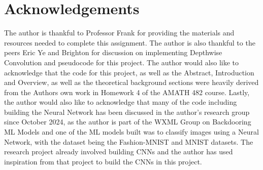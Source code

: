 \documentclass[11pt]{amsart}
\begin{document}
\section*{Acknowledgements}\label{sec:acknowledgements}

The author is thankful to Professor Frank for providing the materials and resources needed to complete this assignment. The author is also thankful to the peers Eric Ye and Brighton for discussion on implementing Depthwise Convolution and pseudocode for this project. The author would also like to acknowledge that the code for this project, as well as the Abstract, Introduction and Overview, as well as the theoretical background sections were heavily derived from the Authors own work in Homework 4 of the AMATH 482 course. Lastly, the author would also like to acknowledge that many of the code including building the Neural Network has been discussed in the author's research group since October 2024, as the author is part of the WXML Group on Backdooring ML Models and one of the ML models built was to classify images using a Neural Network, with the dataset being the Fashion-MNIST and MNIST datasets. The research project already involved building CNNs and the author has used inspiration from that project to build the CNNs in this project.




\end{document}
